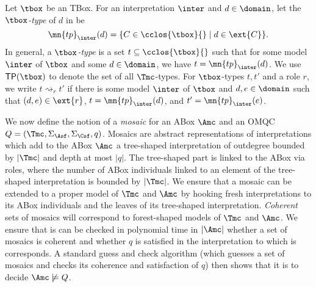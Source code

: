 \documentclass{lmcs}
\theoremstyle{definition}
\begin{document}
Let $\tbox$ be an \alchi TBox. For an interpretation
$\inter$ and $d\in\domain$, let the \emph{$\tbox$-type}
of $d$ in \Imc be
 $$
 \mn{tp}_\inter(d)=\{C\in\cclos{\tbox}{}\mid d\in\ext{C}\}.
$$
In general, a \emph{$\tbox$-type} is a set
$t\subseteq \cclos{\tbox}{}$ such that for some model $\inter$ of
$\tbox$ and some $d\in\domain$, we have $t=\mn{tp}_\inter(d)$. We use
$\mathsf{TP}(\tbox)$ to denote the set of all $\Tmc$-types.  For
$\tbox$-types $t,t'$ and a role $r$, we write $t\rightsquigarrow_r t'$
if there is some model $\inter$ of $\tbox$ and $d,e\in\domain$ such
that $(d,e)\in\ext{r}$, $t=\mn{tp}_\inter(d)$, and
$t'=\mn{tp}_\inter(e)$.

We now define the notion of a \emph{mosaic} for an ABox $\Amc$ and an OMQC $Q=(\Tmc,\Sigma_\Asf,\Sigma_\Csf,q)$. 
Mosaics are abstract representations of interpretations which add to the ABox $\Amc$
a tree-shaped interpretation of outdegree bounded by $|\Tmc|$ and depth at most $|q|$. The tree-shaped
part is linked to the ABox via roles, where the number of ABox individuals linked to an element of
the tree-shaped interpretation is bounded by $|\Tmc|$. We ensure that a mosaic can be extended to a proper 
model of $\Tmc$ and $\Amc$ by hooking fresh interpretations to its ABox individuals and the leaves of its
tree-shaped interpretation. \emph{Coherent} sets of mosaics will correspond to forest-shaped
models of $\Tmc$ and $\Amc$. We ensure that is can be checked in polynomial time in $|\Amc|$ whether a set of 
mosaics is coherent and whether $q$ is satisfied in the interpretation to which is corresponds.
A standard guess and check algorithm (which guesses a set of mosaics and checks its coherence and satisfaction of $q$)
then shows that it is \np to decide $\Amc\not\models Q$.
\end{document}
